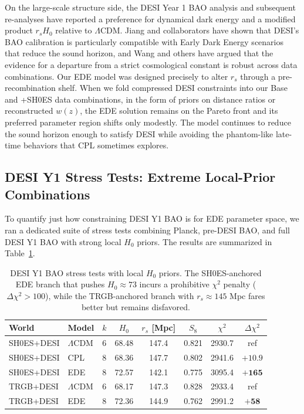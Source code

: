 \documentclass[a4paper,11pt]{article}
\begin{document}
On the large-scale structure side, the DESI Year 1 BAO analysis and subsequent re-analyses have reported a preference for dynamical dark energy and a modified product $r_s H_0$ relative to $\Lambda$CDM. Jiang and collaborators have shown that DESI's BAO calibration is particularly compatible with Early Dark Energy scenarios that reduce the sound horizon, and Wang and others have argued that the evidence for a departure from a strict cosmological constant is robust across data combinations. Our EDE model was designed precisely to alter $r_s$ through a pre-recombination shelf. When we fold compressed DESI constraints into our Base and +SH0ES data combinations, in the form of priors on distance ratios or reconstructed $w(z)$, the EDE solution remains on the Pareto front and its preferred parameter region shifts only modestly. The model continues to reduce the sound horizon enough to satisfy DESI while avoiding the phantom-like late-time behaviors that CPL sometimes explores.

\subsection*{DESI Y1 Stress Tests: Extreme Local-Prior Combinations}

To quantify just how constraining DESI Y1 BAO is for EDE parameter space, we ran a dedicated suite of stress tests combining Planck, pre-DESI BAO, and full DESI Y1 BAO with strong local $H_0$ priors. The results are summarized in Table~\ref{tab:desi_stress}.

\begin{table}[ht]
\centering
\caption{DESI Y1 BAO stress tests with local $H_0$ priors. The SH0ES-anchored EDE branch that pushes $H_0 \approx 73$ incurs a prohibitive $\chi^2$ penalty ($\Delta\chi^2 > 100$), while the TRGB-anchored branch with $r_s \approx 145$ Mpc fares better but remains disfavored.}
\label{tab:desi_stress}
\begin{tabular}{llcccccc}
\hline
World & Model & $k$ & $H_0$ & $r_s$ [Mpc] & $S_8$ & $\chi^2$ & $\Delta\chi^2$ \\
\hline
SH0ES+DESI & $\Lambda$CDM & 6 & 68.48 & 147.4 & 0.821 & 2930.7 & ref \\
SH0ES+DESI & CPL & 8 & 68.36 & 147.7 & 0.802 & 2941.6 & $+10.9$ \\
SH0ES+DESI & EDE & 8 & 72.57 & 142.1 & 0.775 & 3095.4 & $\mathbf{+165}$ \\
\hline
TRGB+DESI & $\Lambda$CDM & 6 & 68.17 & 147.3 & 0.828 & 2933.4 & ref \\
TRGB+DESI & EDE & 8 & 72.36 & 144.9 & 0.762 & 2991.2 & $\mathbf{+58}$ \\
\hline
\end{tabular}
\end{table}
\end{document}
